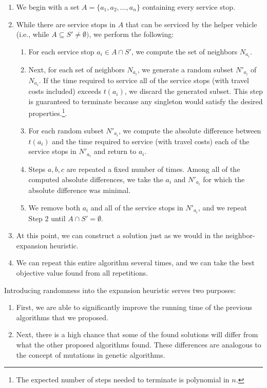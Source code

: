\documentclass[12pt]{scrartcl}
\begin{document}
\begin{enumerate}
    \item We begin with a set $A = \{a_1, a_2, \ldots, a_n\}$ containing every service stop.
    \item While there are service stops in $A$ that can be serviced by the helper vehicle (i.e., while $A \subseteq S' \neq \emptyset)$, we perform the following:
    \begin{enumerate}
        \item For each service stop $a_i \in A \cap S'$, we compute the set of neighbors $N_{a_i}$.
        \item Next, for each set of neighbors $N_{a_i}$, we generate a random subset $N'_{a_i}$ of $N_{a_i}$. If the time required to service all of the service stops (with travel costs included) exceeds $t(a_i)$, we discard the generated subset. This step is guaranteed to terminate because any singleton would satisfy the desired properties.\footnote{The expected number of steps needed to terminate is polynomial in $n$.}. 
        \item For each random subset $N'_{a_i}$, we compute the absolute difference between $t(a_i)$ and the time required to service (with travel costs) each of the service stops in $N'_{a_i}$ and return to $a_i$.
        \item Steps $a, b, c$ are repeated a fixed number of times. Among all of the computed absolute differences, we take the $a_i$ and $N'_{a_i}$ for which the absolute difference was minimal. 
        \item We remove both $a_i$ and all of the service stops in $N'_{a_i}$, and we repeat Step $2$ until $A \cap S' = \emptyset$.
    \end{enumerate}
    \item At this point, we can construct a solution just as we would in the neighbor-expansion heuristic. 
    \item We can repeat this entire algorithm several times, and we can take the best objective value found from all repetitions. 
\end{enumerate}

Introducing randomness into the expansion heuristic serves two purposes:

\begin{enumerate}
    \item First, we are able to significantly improve the running time of the previous algorithms that we proposed.
    \item Next, there is a high chance that some of the found solutions will differ from what the other proposed algorithms found. These differences are analogous to the concept of mutations in genetic algorithms. 
\end{enumerate}
\end{document}
